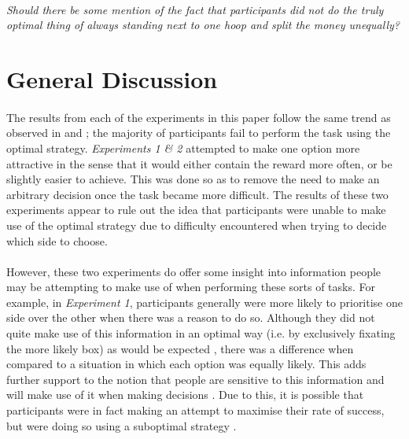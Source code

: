 \documentclass[12pt]{article}
\begin{document}
\paragraph{} \textit{Should there be some mention of the fact that participants did not do the truly optimal thing of always standing next to one hoop and split the money unequally?} 

\section*{General Discussion}
\paragraph{} The results from each of the experiments in this paper follow the same trend as observed in \cite{clarke2015failure} and \cite{James2017}; the majority of participants fail to perform the task using the optimal strategy. \textit{Experiments 1 \& 2} attempted to make one option more attractive in the sense that it would either contain the reward more often, or be slightly easier to achieve. This was done so as to remove the need to make an arbitrary decision once the task became more difficult. The results of these two experiments appear to rule out the idea that participants were unable to make use of the optimal strategy due to difficulty encountered when trying to decide which side to choose. 

\paragraph{} However, these two experiments do offer some insight into information people may be attempting to make use of when performing these sorts of tasks. For example, in \textit{Experiment 1}, participants generally were more likely to prioritise one side over the other when there was a reason to do so. Although they did not quite make use of this information in an optimal way (i.e. by exclusively fixating the more likely box) as would be expected \citep{koehler2014probability}, there was a difference when compared to a situation in which each option was equally likely. This adds further support to the notion that people are sensitive to this information and will make use of it when making decisions \citep{wolford2004searching,yellott1969probability}. Due to this, it is possible that participants were in fact making an attempt to maximise their rate of success, but were doing so using a suboptimal strategy \citep{Gao2015}.  
\end{document}
